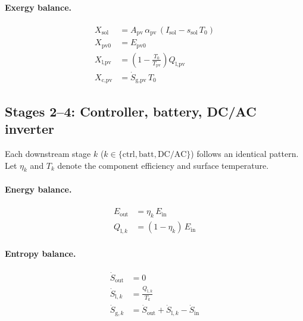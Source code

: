\paragraph{Exergy balance.}
\begin{align}
  X_\text{sol}  &= A_\text{pv}\,\alpha_\text{pv}\,(I_\text{sol} - s_\text{sol}\,T_0)  \label{eq:pv-Xsol}  \\
  X_\text{pv0}  &= E_\text{pv0}                                                         \label{eq:pv-Xpv0}  \\
  X_\text{l,pv} &= \left(1 - \frac{T_0}{T_\text{pv}}\right) Q_\text{l,pv}             \label{eq:pv-Xlpv}  \\
  X_\text{c,pv} &= \dot{S}_\text{g,pv}\,T_0                                             \label{eq:pv-Xcpv}
\end{align}

\subsection{Stages 2--4: Controller, battery, DC/AC inverter}
\label{sec:pv-stages234}

Each downstream stage $k$ ($k \in \{\text{ctrl}, \text{batt}, \text{DC/AC}\}$) follows an identical pattern. Let $\eta_k$ and $T_k$ denote the component efficiency and surface temperature.

\paragraph{Energy balance.}
\begin{align}
  E_\text{out} &= \eta_k\,E_\text{in}          \label{eq:pv-generic-E}  \\
  Q_{\text{l},k} &= (1 - \eta_k)\,E_\text{in}   \label{eq:pv-generic-Ql}
\end{align}

\paragraph{Entropy balance.}
\begin{align}
  \dot{S}_\text{out}  &= 0                                                 \label{eq:pv-generic-Sout}  \\
  \dot{S}_{\text{l},k}  &= \frac{Q_{\text{l},k}}{T_k}                     \label{eq:pv-generic-Sl}    \\
  \dot{S}_{\text{g},k}  &= \dot{S}_\text{out} + \dot{S}_{\text{l},k} - \dot{S}_\text{in}  \label{eq:pv-generic-Sg}
\end{align}

